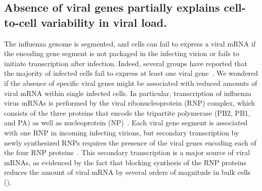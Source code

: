\documentclass[9pt,lineno]{elife}
\begin{document}
\subsection{Absence of viral genes partially explains cell-to-cell variability in viral load.}
The influenza genome is segmented, and cells can fail to express a viral mRNA if the encoding gene segment is not packaged in the infecting virion or fails to initiate transcription after infection.
Indeed, several groups have reported that the majority of infected cells fail to express at least one viral gene~\citep{Brooke:2013kb, Heldt:2015iz,Dou:2017cp}. 
We wondered if the absence of specific viral genes might be associated with reduced amounts of viral mRNA within single infected cells.
In particular, transcription of influenza virus mRNAs is performed by the viral ribonucleoprotein (RNP) complex, which consists of the three proteins that encode the tripartite polymerase (PB2, PB1, and PA) as well as nucleoprotein (NP)~\citep{huang1990determination}.
Each viral gene segment is associated with one RNP in incoming infecting virions, but secondary transcription by newly synthesized RNPs requires the presence of the viral genes encoding each of the four RNP proteins~\citep{Vreede:2004ip,eisfeld2015centre}.
This secondary transcription is a major source of viral mRNAs, as evidenced by the fact that blocking synthesis of the RNP proteins reduces the amount of viral mRNA by several orders of magnitude in bulk cells ().
\end{document}
